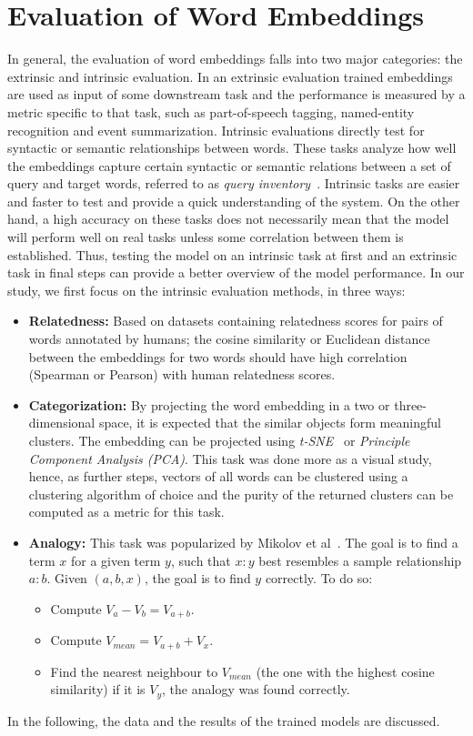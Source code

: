 \section{Evaluation of Word Embeddings}\label{sec:eval_embeddings}
In general, the evaluation of word embeddings falls into two major categories: the extrinsic and intrinsic evaluation. In an extrinsic evaluation trained embeddings are used as input of some downstream task and the performance is measured by a metric specific to that task, such as part-of-speech tagging, named-entity recognition and event summarization. Intrinsic evaluations directly test for syntactic or semantic relationships between words. These tasks analyze how well the embeddings capture certain syntactic or semantic relations between a set of query and target words, referred to as \textit{query inventory}~\cite{DBLP:conf/emnlp/SchnabelLMJ15}. Intrinsic tasks are easier and faster to test and provide a quick understanding of the system. On the other hand, a high accuracy on these tasks does not necessarily mean that the model will perform well on real tasks unless some correlation between them is established. Thus, testing the model on an intrinsic task at first and an extrinsic task in final steps can provide a better overview of the model performance. In our study, we first focus on the intrinsic evaluation methods, in three ways: 
 \begin{itemize}
 \item \textbf{Relatedness:} Based on datasets containing relatedness scores for pairs of words annotated by humans; the cosine similarity or Euclidean distance between the embeddings for two words should have high correlation (Spearman or Pearson) with human relatedness scores.
  \item \textbf{Categorization:} By projecting the word embedding in a two or three-dimensional space, it is expected that the similar objects form meaningful clusters. The embedding can be projected using \emph{t-SNE}~\cite{SCHOL:journals/jmlr/Maaten} or \emph{Principle Component Analysis (PCA)}. This task was done more as a visual study, hence, as further steps, vectors of all words can be clustered using a clustering algorithm of choice and the purity of the returned clusters can be computed as a metric for this task. 

 \item \textbf{Analogy:} This task was popularized by Mikolov et al~\cite{DBLP:journals/corr/abs-1301-3781}. The goal is to find a term $x$ for a given term $y$, such that  $x : y$ best resembles a sample relationship $a : b$. Given $(a,b,x)$, the goal is to find $y$ correctly. To do so: 
\begin{itemize}
    \item Compute $V_a-V_b=V_{a+b}$.
    \item  Compute $V_{mean}=V_{a+b}+V_x$.
    \item  Find the nearest neighbour to $V_{mean}$ (the one with the highest cosine similarity) if it is $V_y$, the analogy was found correctly.
  \end{itemize}
   \end{itemize}
In the following, the data and the results of the trained models are discussed. 
